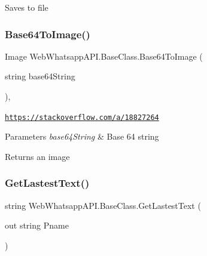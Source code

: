 Saves to file 

\mbox{\label{class_web_whatsapp_a_p_i_1_1_base_class_a3c18dac86c5b0a57ebfb1822e89518d8}} 
\subsubsection{\texorpdfstring{Base64\+To\+Image()}{Base64ToImage()}}
{\footnotesize\ttfamily Image Web\+Whatsapp\+A\+P\+I.\+Base\+Class.\+Base64\+To\+Image (\begin{DoxyParamCaption}\item[{string}]{base64\+String }\end{DoxyParamCaption})\hspace{0.3cm}{\ttfamily [inline]}, {\ttfamily [protected]}}



\href{https://stackoverflow.com/a/18827264}{\tt https\+://stackoverflow.\+com/a/18827264} 


\begin{DoxyParams}{Parameters}
{\em base64\+String} & Base 64 string\\
\hline
\end{DoxyParams}
\begin{DoxyReturn}{Returns}
an image
\end{DoxyReturn}
\mbox{\label{class_web_whatsapp_a_p_i_1_1_base_class_a9b62276c558e7e81cf507af854cdc0b2}} 
\subsubsection{\texorpdfstring{Get\+Lastest\+Text()}{GetLastestText()}}
{\footnotesize\ttfamily string Web\+Whatsapp\+A\+P\+I.\+Base\+Class.\+Get\+Lastest\+Text (\begin{DoxyParamCaption}\item[{out string}]{Pname }\end{DoxyParamCaption})\hspace{0.3cm}{\ttfamily [inline]}}



